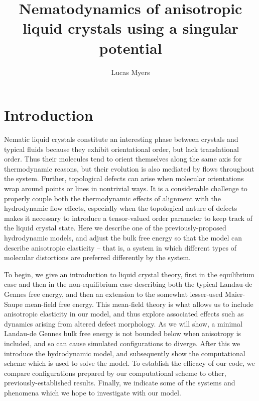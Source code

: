 \documentclass[reqno]{article}
\begin{document}
	\title{Nematodynamics of anisotropic liquid crystals using a singular potential}
	\author{Lucas Myers}
	\maketitle

  \section{Introduction}
  Nematic liquid crystals constitute an interesting phase between crystals and
  typical fluids because they exhibit orientational order, but lack
  translational order.
  Thus their molecules tend to orient themselves along the same axis for thermodynamic
  reasons, but their evolution is also mediated by flows throughout the system.
  Further, topological defects can arise when molecular orientations wrap around
  points or lines in nontrivial ways.
  It is a considerable challenge to properly couple both the thermodynamic
  effects of alignment with the hydrodynamic flow effects, especially when the
  topological nature of defects makes it necessary to introduce a tensor-valued
  order parameter to keep track of the liquid crystal state.
  Here we describe one of the previously-proposed hydrodynamic models, and
  adjust the bulk free energy so that the model can describe anisotropic
  elasticity -- that is, a system in which different types of molecular
  distortions are preferred differently by the system.

  To begin, we give an introduction to liquid crystal theory, first in the
  equilibrium case and then in the non-equilibrium case describing both the
  typical Landau-de Gennes free energy, and then an extension to the somewhat lesser-used
  Maier-Saupe mean-field free energy.
  This mean-field theory is what allows us to include anisotropic elasticity in
  our model, and thus explore associated effects such as dynamics arising from
  altered defect morphology.
  As we will show, a minimal Landau-de Gennes bulk free energy is not
  bounded below when anisotropy is included, and so can cause simulated
  configurations to diverge.
  After this we introduce the hydrodynamic model, and subsequently show the
  computational scheme which is used to solve the model.
  To establish the efficacy of our code, we compare configurations prepared by
  our computational scheme to other, previously-established results.
  Finally, we indicate some of the systems and phenomena which we hope to
  investigate with our model.
  
\end{document}
